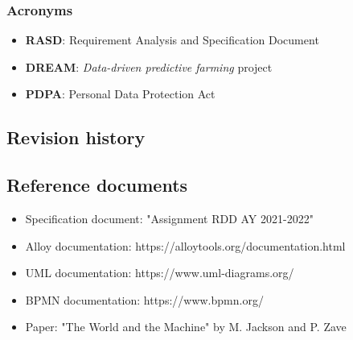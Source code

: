 \documentclass[table, 12pt]{article}
\begin{document}
\subsubsection*{Acronyms}
\begin{itemize}
    \item \textbf{RASD}: Requirement Analysis and Specification Document
    \item \textbf{DREAM}: \emph{Data-driven predictive farming} project
    \item \textbf{PDPA}: Personal Data Protection Act 
\end{itemize}
\subsection{Revision history}
\subsection{Reference documents}
\begin{itemize}
    \item Specification document: "Assignment RDD AY 2021-2022"
    \item Alloy documentation: https://alloytools.org/documentation.html
    \item UML documentation: https://www.uml-diagrams.org/
    \item BPMN documentation: https://www.bpmn.org/
    \item Paper: "The World and the Machine" by M. Jackson and P. Zave
\end{itemize}
\end{document}
